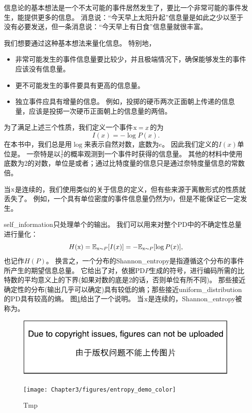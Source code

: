 信息论的基本想法是一个不太可能的事件居然发生了，要比一个非常可能的事件发生，能提供更多的信息。
消息说：``今天早上太阳升起''信息量是如此之少以至于没有必要发送，但一条消息说：``今天早上有日食''信息量就很丰富。


我们想要通过这种基本想法来量化信息。
特别地，
\begin{itemize}
\item 非常可能发生的事件信息量要比较少，并且极端情况下，确保能够发生的事件应该没有信息量。

\item 更不可能发生的事件要具有更高的信息量。

\item 独立事件应具有增量的信息。
例如，投掷的硬币两次正面朝上传递的信息量，应该是投掷一次硬币正面朝上的信息量的两倍。
\end{itemize}

为了满足上述三个性质，我们定义一个事件$\mathrm{x} = x$的为
\begin{equation}
I(x) = -\log P(x).
\end{equation}
在本书中，我们总是用$\log$来表示自然对数，底数为$e$。
因此我们定义的$I(x)$单位是。
一奈特是以$\frac{1}{e}$的概率观测到一个事件时获得的信息量。
其他的材料中使用底数为2的对数，单位是或者；通过比特度量的信息只是通过奈特度量信息的常数倍。

当$\mathrm{x}$是连续的，我们使用类似的关于信息的定义，但有些来源于离散形式的性质就丢失了。
例如，一个具有单位密度的事件信息量仍然为0，但是不能保证它一定发生。

\gls{self_information}只处理单个的输出。
我们可以用来对整个\gls{PD}中的不确定性总量进行量化：
\begin{equation}
H(\mathrm{x}) = \mathbb{E}_{\mathrm{x} \sim P}[I(x)] = -\mathbb{E}_{\mathrm{x} \sim P}[\log P(x)],
\end{equation}
也记作$H(P)$。
换言之，一个分布的\gls{Shannon_entropy}是指遵循这个分布的事件所产生的期望信息总量。
它给出了对，依据\gls{PD}$P$生成的符号，进行编码所需的比特数的平均意义上的下界(如果对数的底是2的话，否则单位有所不同)。
那些接近确定性的分布(输出几乎可以确定)具有较低的熵；那些接近\gls{uniform_distribution}的\gls{PD}具有较高的熵。
图\ref{fig:chap3_entropy_demo_color}给出了一个说明。
当$\mathrm{x}$是连续的，\gls{Shannon_entropy}被称为。
\begin{figure}[!htb]
\ifOpenSource
\centerline{\includegraphics{figure.pdf}}
\else
\centerline{\texttt{[image: Chapter3/figures/entropy\_demo\_color]}}
\fi
\caption{Tmp}
\label{fig:chap3_entropy_demo_color}
\end{figure}


